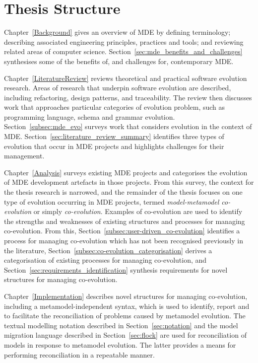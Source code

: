 
\section{Thesis Structure}
Chapter~\ref{Background} gives an overview of MDE by defining terminology; describing associated engineering principles, practices and tools; and reviewing related areas of computer science. Section~\ref{sec:mde_benefits_and_challenges} synthesises some of the benefits of, and challenges for, contemporary MDE.

Chapter~\ref{LiteratureReview} reviews theoretical and practical software evolution research. Areas of research that underpin software evolution are described, including refactoring, design patterns, and traceability. The review then discusses work that approaches particular categories of evolution problem, such as programming language, schema and grammar evolution. Section~\ref{subsec:mde_evo} surveys work that considers evolution in the context of MDE. Section~\ref{sec:literature_review_summary} identifies three types of evolution that occur in MDE projects and highlights challenges for their management.

Chapter~\ref{Analysis} surveys existing MDE projects and categorises the evolution of MDE development artefacts in those projects. From this survey, the context for the thesis research is narrowed, and the remainder of the thesis focuses on one type of evolution occurring in MDE projects, termed \emph{model-metamodel co-evolution} or simply \emph{co-evolution}. Examples of co-evolution are used to identify the strengths and weaknesses of existing structures and processes for managing co-evolution. From this, Section~\ref{subsec:user-driven_co-evolution} identifies a process for managing co-evolution which has not been recognised previously in the literature, Section~\ref{subsec:co-evolution_categorisation} derives a categorisation of existing processes for managing co-evolution, and Section~\ref{sec:requirements_identification} synthesis requirements for novel structures for managing co-evolution.

Chapter~\ref{Implementation} describes novel structures for managing co-evolution, including a metamodel-independent syntax, which is used to identify, report and to facilitate the reconciliation of problems caused by metamodel evolution. The textual modelling notation described in Section~\ref{sec:notation} and the model migration language described in Section~\ref{sec:flock} are used for reconciliation of models in response to metamodel evolution. The latter provides a means for performing reconciliation in a repeatable manner.

